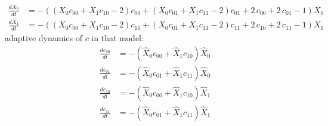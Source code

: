 \documentclass{article}
\begin{document}
\[\begin{align*}
\frac{dX_{0}}{dt} &= -{\left({\left(X_{0} c_{00} + X_{1} c_{10} - 2\right)} c_{00} + {\left(X_{0} c_{01} + X_{1} c_{11} - 2\right)} c_{01} + 2 \, c_{00} + 2 \, c_{01} - 1\right)} X_{0}\\
\frac{dX_{1}}{dt} &= -{\left({\left(X_{0} c_{00} + X_{1} c_{10} - 2\right)} c_{10} + {\left(X_{0} c_{01} + X_{1} c_{11} - 2\right)} c_{11} + 2 \, c_{10} + 2 \, c_{11} - 1\right)} X_{1}
\end{align*}\]
adaptive dynamics of $c$ in that model:
\[\begin{align*}
\frac{dc_{00}}{dt} &= -{\left(\hat{X}_{0} c_{00} + \hat{X}_{1} c_{10}\right)} \hat{X}_{0}\\
\frac{dc_{01}}{dt} &= -{\left(\hat{X}_{0} c_{01} + \hat{X}_{1} c_{11}\right)} \hat{X}_{0}\\
\frac{dc_{10}}{dt} &= -{\left(\hat{X}_{0} c_{00} + \hat{X}_{1} c_{10}\right)} \hat{X}_{1}\\
\frac{dc_{11}}{dt} &= -{\left(\hat{X}_{0} c_{01} + \hat{X}_{1} c_{11}\right)} \hat{X}_{1}
\end{align*}\]
\end{document}
